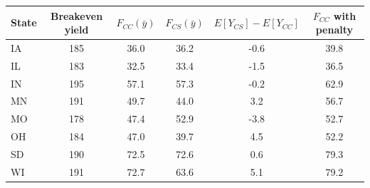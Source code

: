 \begin{tabular}{lccccc}
\toprule
State & Breakeven yield & $F_{CC}(\bar y)$ & $F_{CS}(\bar y)$ & $E[Y_{CS}]-E[Y_{CC}]$ & $F_{CC}$ with penalty\\
\midrule
IA & 185 & 36.0 & 36.2 & -0.6 & 39.8 \\
IL & 183 & 32.5 & 33.4 & -1.5 & 36.5 \\
IN & 195 & 57.1 & 57.3 & -0.2 & 62.9 \\
MN & 191 & 49.7 & 44.0 & 3.2 & 56.7 \\
MO & 178 & 47.4 & 52.9 & -3.8 & 52.7 \\
OH & 184 & 47.0 & 39.7 & 4.5 & 52.2 \\
SD & 190 & 72.5 & 72.6 & 0.6 & 79.3 \\
WI & 191 & 72.7 & 63.6 & 5.1 & 79.2 \\
\bottomrule
\end{tabular}
